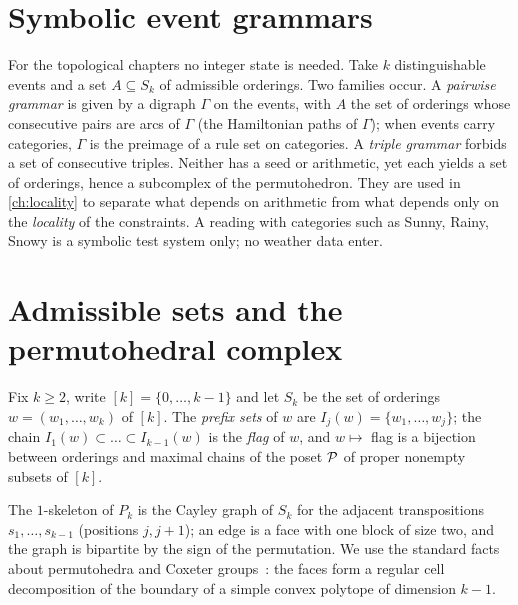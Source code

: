 \section{Symbolic event grammars}\label{sec:symbolic}
For the topological chapters no integer state is needed. Take $k$ distinguishable events and a set $A\subseteq S_k$ of admissible orderings. Two families occur. A \emph{pairwise grammar} is given by a digraph $\Gamma$ on the events, with $A$ the set of orderings whose consecutive pairs are arcs of $\Gamma$ (the Hamiltonian paths of $\Gamma$); when events carry categories, $\Gamma$ is the preimage of a rule set on categories. A \emph{triple grammar} forbids a set of consecutive triples. Neither has a seed or arithmetic, yet each yields a set of orderings, hence a subcomplex of the permutohedron. They are used in \cref{ch:locality} to separate what depends on arithmetic from what depends only on the \emph{locality} of the constraints. A reading with categories such as Sunny, Rainy, Snowy is a symbolic test system only; no weather data enter.

\section{Admissible sets and the permutohedral complex}\label{sec:complex}
Fix $k\ge2$, write $[k]=\{0,\dots,k-1\}$ and let $S_k$ be the set of orderings $w=(w_1,\dots,w_k)$ of $[k]$. The \emph{prefix sets} of $w$ are $I_j(w)=\{w_1,\dots,w_j\}$; the chain $I_1(w)\subset\dots\subset I_{k-1}(w)$ is the \emph{flag} of $w$, and $w\mapsto$ flag is a bijection between orderings and maximal chains of the poset $\mathcal{P}$ of proper nonempty subsets of $[k]$.

The $1$-skeleton of $P_k$ is the Cayley graph of $S_k$ for the adjacent transpositions $s_1,\dots,s_{k-1}$ (positions $j,j{+}1$); an edge is a face with one block of size two, and the graph is bipartite by the sign of the permutation. We use the standard facts about permutohedra and Coxeter groups~\cite{Ziegler,BjornerBrenti}: the faces form a regular cell decomposition of the boundary of a simple convex polytope of dimension $k-1$.

